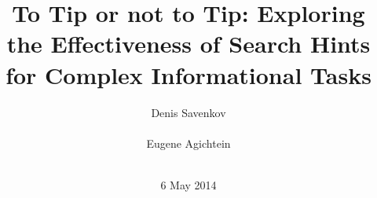 \documentclass{sig-alternate}
\begin{document}
%

\title{To Tip or not to Tip: Exploring the Effectiveness of Search Hints for Complex Informational Tasks}

%
%
%
%
%


\author{
\alignauthor
Denis Savenkov\\
       \\
\alignauthor
Eugene Agichtein\\
       \\
}
\date{6 May 2014}

\maketitle
\end{document}
